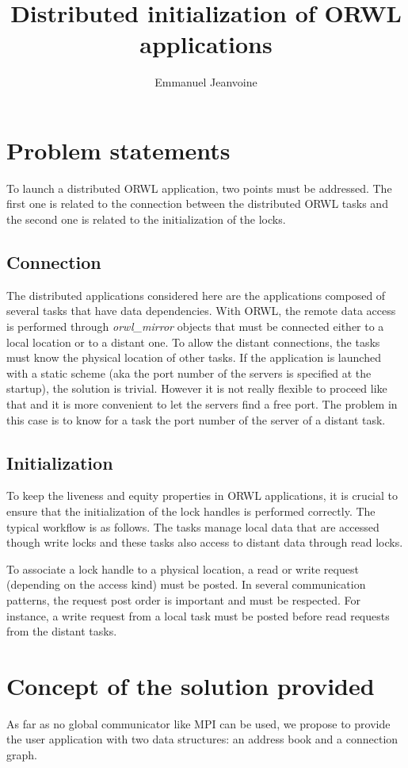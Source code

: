 \documentclass[10pt]{article}
\title{Distributed initialization of ORWL applications}
\author{Emmanuel Jeanvoine}
\begin{document}
\maketitle

\section{Problem statements}
To launch a distributed ORWL application, two points must be
addressed. The first one is related to the connection between the
distributed ORWL tasks and the second one is related to the
initialization of the locks.

\subsection{Connection}
The distributed applications considered here are the applications
composed of several tasks that have data dependencies. With ORWL, the
remote data access is performed through \textit{orwl\_mirror} objects
that must be connected either to a local location or to a distant
one. To allow the distant connections, the tasks must know the
physical location of other tasks. If the application is launched with
a static scheme (aka the port number of the servers is specified at
the startup), the solution is trivial. However it is not really
flexible to proceed like that and it is more convenient to let the
servers find a free port. The problem in this case is to know for a
task the port number of the server of a distant task.

\subsection{Initialization}
To keep the liveness and equity properties in ORWL applications, it is
crucial to ensure that the initialization of the lock handles is
performed correctly. The typical workflow is as follows. The tasks
manage local data that are accessed though write locks and these tasks
also access to distant data through read locks.

To associate a lock handle to a physical location, a read or write
request (depending on the access kind) must be posted. In several
communication patterns, the request post order is important and must
be respected. For instance, a write request from a local task must be
posted before read requests from the distant tasks.

\section{Concept of the solution provided}
As far as no global communicator like MPI can be used, we propose to
provide the user application with two data structures: an address book
and a connection graph.
\end{document}
